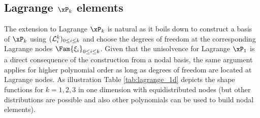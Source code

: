 \subsection{Lagrange $\xP_k$ elements}

The extension to Lagrange $\xP_k$ is natural as it boils down to construct a basis of $\xP_k$ using $(\mathcal L^{k}_{i})_{0\leq i \leq k}$ and choose the degrees of freedom at the corresponding Lagrange nodes $\Fam{\xi_i}_{0\leq i \leq k}$.
Given that the unisolvence for Lagrange $\xPone$ is a direct consequence of the construction from a nodal basis, the same argument applies for higher polynomial order as long as degrees of freedom are located at Lagrange nodes.
As illustration Table \ref{tab:lagrange_1d} depicts the shape functions for $k=1,2,3$ in one dimension with equidistributed nodes (but other distributions are possible and also other polynomials can be used to build nodal elements).

